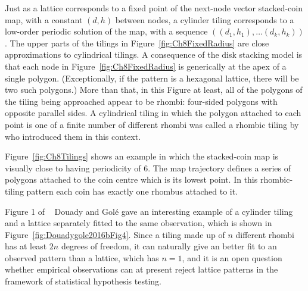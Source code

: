 Just as a lattice corresponds to a fixed point of the next-node vector stacked-coin map, with a constant $(d,h)$ between nodes, a cylinder tiling corresponds to a low-order periodic solution of the map, with a sequence $((d_1,h_1),\ldots (d_k,h_k) )$. The upper parts of the tilings in Figure~\ref{fig:Ch8FixedRadius} are close approximations to cylindrical tilings.
A consequence of the disk stacking model is that each node in Figure~\ref{fig:Ch8FixedRadius} is generically at the apex of a single polygon. (Exceptionally, if the pattern is a hexagonal lattice, there will be two such polygons.)
More than that, in this Figure at least, all of the polygons of the tiling being approached appear to be rhombi: four-sided polygons with opposite parallel sides.%
A cylindrical tiling in which the polygon attached to each point is one of a finite number of different rhombi was called a rhombic tiling by~\cite{atelaRhombicTilingsPrimordia2017} who introduced them in this context.

Figure~\ref{fig:Ch8Tilings} shows an example in which the stacked-coin map is visually close to having periodicity of 6. The map trajectory defines a series of polygons attached to the coin centre which is its lowest point. In this rhombic-tiling pattern each coin has exactly one rhombus attached to it.

\clearpage
{}






\clearpage

 {Figure 1 of ~\autocite{atelaRhombicTilingsPrimordia2017}} 
Douady and Gol\'e  gave an interesting example of a cylinder tiling and a lattice separately fitted to the same observation, which is shown in Figure~\ref{fig:Douadygole2016bFig4}. Since a tiling made up of $n$ different rhombi has at least $2n$ degrees of freedom, it can naturally give an better fit to an observed pattern than a lattice, which has $n=1$, and it is an open question whether empirical observations can at present reject lattice patterns in the framework of statistical hypothesis testing.%

